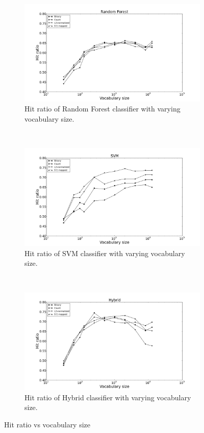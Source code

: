 \begin{figure}[H]
\begin{subfigure}[b]{\figwidth}
		\includegraphics[width=\textwidth]{img/Random-Forest-hitrate-eps-converted-to.pdf}
		\caption{Hit ratio of Random Forest classifier with varying vocabulary size.}
		\label{fig:hitratio-rf}
	\end{subfigure}
	~
	\begin{subfigure}[b]{\figwidth}
		\includegraphics[width=\textwidth]{img/SVM-hitrate-eps-converted-to.pdf}
		\caption{Hit ratio of SVM classifier with varying vocabulary size.}
		\label{fig:hitratio-svm}
	\end{subfigure}
	\\
	\begin{subfigure}[b]{\figwidth}
		\includegraphics[width=\textwidth]{img/Hybrid-hitrate-eps-converted-to.pdf}
		\caption{Hit ratio of Hybrid classifier with varying vocabulary size.}
		\label{fig:hitratio-hybrid}
	\end{subfigure}
	\caption{Hit ratio vs vocabulary size}
	\label{fig:hitratio}
\end{figure}

